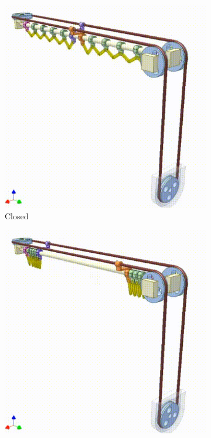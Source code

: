 \documentclass[a4paper,12pt]{article}
\begin{document}
\begin{figure}
    \centering
    \begin{subfigure}{0.3\textwidth}
        \includegraphics[width=\textwidth]{figures/initialCurtainMechanism1.png}
        \caption{Closed}
    \end{subfigure}
    \hfill
    \begin{subfigure}{0.3\textwidth}
        \includegraphics[width=\textwidth]{figures/initialCurtainMechanism2.png}

\end{subfigure}
\end{figure}
\end{document}
